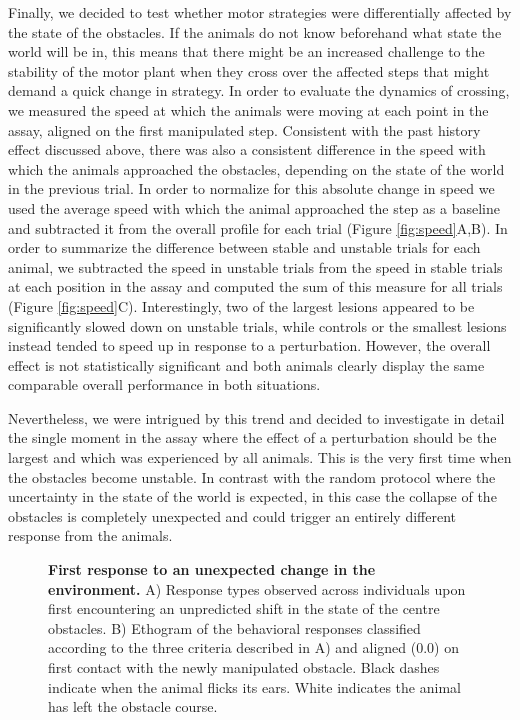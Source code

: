 Finally, we decided to test whether motor strategies were differentially affected by the state of the obstacles. If the animals do not know beforehand what state the world will be in, this means that there might be an increased challenge to the stability of the motor plant when they cross over the affected steps that might demand a quick change in strategy. In order to evaluate the dynamics of crossing, we measured the speed at which the animals were moving at each point in the assay, aligned on the first manipulated step. Consistent with the past history effect discussed above, there was also a consistent difference in the speed with which the animals approached the obstacles, depending on the state of the world in the previous trial. In order to normalize for this absolute change in speed we used the average speed with which the animal approached the step as a baseline and subtracted it from the overall profile for each trial (Figure \ref{fig:speed}A,B). In order to summarize the difference between stable and unstable trials for each animal, we subtracted the speed in unstable trials from the speed in stable trials at each position in the assay and computed the sum of this measure for all trials (Figure \ref{fig:speed}C). Interestingly, two of the largest lesions appeared to be significantly slowed down on unstable trials, while controls or the smallest lesions instead tended to speed up in response to a perturbation. However, the overall effect is not statistically significant and both animals clearly display the same comparable overall performance in both situations.

Nevertheless, we were intrigued by this trend and decided to investigate in detail the single moment in the assay where the effect of a perturbation should be the largest and which was experienced by all animals. This is the very first time when the obstacles become unstable. In contrast with the random protocol where the uncertainty in the state of the world is expected, in this case the collapse of the obstacles is completely unexpected and could trigger an entirely different response from the animals.

\begin{figure}
\centering

\caption{\textbf{First response to an unexpected change in the environment.} A) Response types observed across individuals upon first encountering an unpredicted shift in the state of the centre obstacles. B) Ethogram of the behavioral responses classified according to the three criteria described in A) and aligned (0.0) on first contact with the newly manipulated obstacle. Black dashes indicate when the animal flicks its ears. White indicates the animal has left the obstacle course.}
\label{fig:ethogram}
\end{figure}

